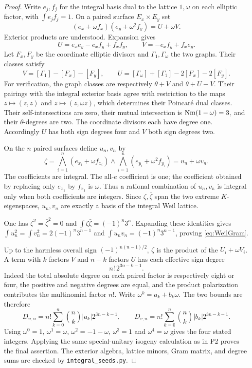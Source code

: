 \documentclass[11pt,a4paper]{article}
\theoremstyle{definition}\newtheorem{definition}[theorem]{Definition}
\theoremstyle{remark}\newtheorem{remark}[theorem]{Remark}
\begin{document}
\begin{proof}
Write $e_j,f_j$ for the integral basis dual to the lattice $1,\omega$ on each elliptic factor, with $\int e_jf_j=1$. On a paired surface $E_x\times E_y$ set
\[
 (e_x+\omega f_x)(e_y+\omega^2 f_y)=U+\omega V.
\]
Exterior products are understood. Expansion gives
\[
 U=e_xe_y-e_xf_y+f_xf_y,\qquad V=-e_xf_y+f_xe_y.
\]
Let $F_x,F_y$ be the coordinate elliptic divisors and $\Gamma_1,\Gamma_\omega$ the two graphs. Their classes satisfy
\[
 V=[\Gamma_1]-[F_x]-[F_y],\qquad
 U=[\Gamma_\omega]+[\Gamma_1]-2[F_x]-2[F_y].
\]
For verification, the graph classes are respectively $\theta+V$ and $\theta+U-V$. Their pairings with the integral exterior basis agree with restriction to the maps $z\mapsto(z,z)$ and $z\mapsto(z,\omega z)$, which determines their Poincar\'e dual classes. Their self-intersections are zero, their mutual intersection is $\operatorname{Nm}(1-\omega)=3$, and their $\theta$-degrees are two. The coordinate divisors each have degree one. Accordingly $U$ has both sign degrees four and $V$ both sign degrees two.

On the $n$ paired surfaces define $u_n,v_n$ by
\[
 \zeta=\bigwedge_{i=1}^n(e_{x_i}+\omega f_{x_i})
        \wedge\bigwedge_{i=1}^n(e_{y_i}+\omega^2f_{y_i})
       =u_n+\omega v_n.
\]
The coefficients are integral. The all-$e$ coefficient is one; the coefficient obtained by replacing only $e_{x_1}$ by $f_{x_1}$ is $\omega$. Thus a rational combination of $u_n,v_n$ is integral only when both coefficients are integers. Since $\zeta,\bar\zeta$ span the two extreme $K$-eigenspaces, $u_n,v_n$ are exactly a basis of the integral Weil lattice.

One has $\zeta^2=\bar\zeta^2=0$ and $\int\zeta\bar\zeta=(-1)^n3^n$. Expanding these identities gives
$\int u_n^2=\int v_n^2=2(-1)^n3^{n-1}$ and $\int u_nv_n=(-1)^n3^{n-1}$, proving \eqref{eq:WeilGram}.

Up to the harmless overall sign $(-1)^{n(n-1)/2}$, $\zeta$ is the product of the $U_i+\omega V_i$. A term with $k$ factors $V$ and $n-k$ factors $U$ has each effective sign degree
\[
 n!\,2^{3n-k-1}.
\]
Indeed the total absolute degree on each paired factor is respectively eight or four, the positive and negative degrees are equal, and the product polarization contributes the multinomial factor $n!$. Write $\omega^k=a_k+b_k\omega$. The two bounds are therefore
\[
 D_{u,n}=n!\sum_{k=0}^n\binom nk|a_k|2^{3n-k-1},\qquad
 D_{v,n}=n!\sum_{k=0}^n\binom nk|b_k|2^{3n-k-1}.
\]
Using $\omega^0=1$, $\omega^1=\omega$, $\omega^2=-1-\omega$, $\omega^3=1$ and $\omega^4=\omega$ gives the four stated integers. Applying the same special-unitary isogeny calculation as in P2 proves the final assertion. The exterior algebra, lattice minors, Gram matrix, and degree sums are checked by \texttt{integral\_seeds.py}.
\end{proof}
\end{document}
